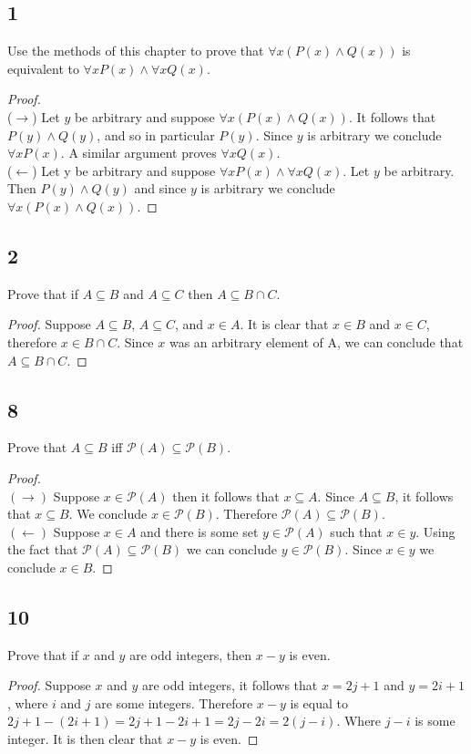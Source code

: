 \documentclass{article}
\begin{document}
\subsection{1}
Use the methods of this chapter to prove that $\forall x (P(x)\land Q (x))$ is equivalent to $\forall x P (x) \land \forall x Q (x)$.
\begin{proof} $ $ \\
($\rightarrow$) Let $y$ be arbitrary and suppose $\forall x(P(x)\land Q(x))$. It follows that $P(y) \land Q(y)$, and so in particular $P(y)$. Since $y$ is arbitrary we conclude $\forall x P(x)$. A similar argument proves $\forall x Q(x)$.
$ $ \\
($\leftarrow$) Let y be arbitrary and suppose $\forall x P(x) \land \forall x Q(x)$. Let $y$ be arbitrary. Then $P(y)\land Q(y)$ and since $y$ is arbitrary we conclude $\forall x (P(x)\land Q(x))$.
\end{proof}
\subsection{2}
Prove that if $A \subseteq B$ and $A \subseteq C$ then $A \subseteq B \cap C$.

\begin{proof}
Suppose $A \subseteq B$, $A \subseteq C$, and $x \in A$. It is clear that $x \in B$ and $x \in C$, therefore $x \in B \cap C$. Since $x$ was an arbitrary element of A, we can conclude that $A \subseteq B \cap C$.
\end{proof}
\subsection{8}
Prove that $A \subseteq B$ iff $\mathscr{P}(A)\subseteq \mathscr{P}(B)$.
\begin{proof}$ $ \\
$(\rightarrow)$ Suppose $x \in \mathscr{P}(A)$ then it follows that $x \subseteq A$. Since $A \subseteq B$, it follows that $x \subseteq B$. We conclude $x \in \mathscr{P}(B)$. Therefore $\mathscr{P}(A)\subseteq \mathscr{P}(B)$.
$ $ \\
$(\leftarrow)$ Suppose $x \in A$ and there is some set $y \in \mathscr{P}(A)$ such that $x \in y$. Using the fact that $\mathscr{P}(A)\subseteq \mathscr{P}(B)$ we can conclude $y \in \mathscr{P}(B)$. Since $x \in y$ we conclude $x \in B$.
\end{proof}
\subsection{10}
Prove that if $x$ and $y$ are odd integers, then $x-y$ is even.
\begin{proof}
Suppose $x$ and $y$ are odd integers, it follows that $x = 2j + 1$ and $y = 2i + 1$, where $i$ and $j$ are some integers. Therefore $x-y$ is equal to $2j+1-(2i+1) = 2j+1-2i+1 = 2j-2i = 2(j-i)$. Where $j-i$ is some integer. It is then clear that $x-y$ is even.
\end{proof}
\end{document}
